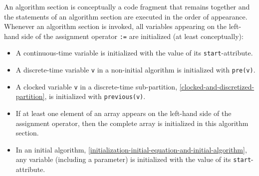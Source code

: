 An algorithm section is conceptually a code fragment that remains together and the statements of an algorithm section are executed in the order of appearance.
Whenever an algorithm section is invoked, all variables appearing on the left-hand side of the assignment operator \lstinline!:=! are initialized (at least conceptually):
\begin{itemize}
\item
  A continuous-time variable is initialized with the value of its \lstinline!start!-attribute.
\item
  A discrete-time variable \lstinline!v! in a non-initial algorithm is initialized with \lstinline!pre(v)!.
\item
  A clocked variable \lstinline!v! in a discrete-time sub-partition, \cref{clocked-and-discretized-partition}, is initialized with \lstinline!previous(v)!.
\item
  If at least one element of an array appears on the left-hand side of the assignment operator, then the complete array is initialized in this algorithm section.
\item
  In an initial algorithm, \cref{initialization-initial-equation-and-initial-algorithm}, any variable (including a parameter) is initialized with the value of its \lstinline!start!-attribute.
\end{itemize}

